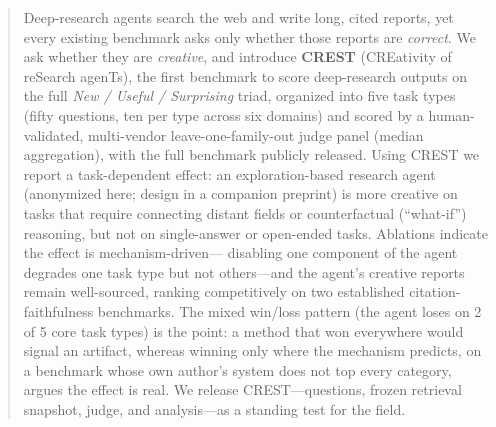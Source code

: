 \begin{abstract}
Deep-research agents search the web and write long, cited reports, yet every existing
benchmark asks only whether those reports are \emph{correct}. We ask whether they are
\emph{creative}, and introduce \textbf{CREST} (CREativity of reSearch agenTs), the first
benchmark to score deep-research outputs on the full \emph{New / Useful / Surprising} triad,
organized into five task types (fifty questions, ten per type across six domains) and scored by a
human-validated, multi-vendor leave-one-family-out judge panel (median aggregation), with the full
benchmark publicly released. Using CREST we report a task-dependent effect: an exploration-based research agent
(anonymized here; design in a companion preprint) is more creative on tasks that require
connecting distant fields or counterfactual (``what-if'') reasoning, but not on
single-answer or open-ended tasks. Ablations indicate the effect is mechanism-driven---
disabling one component of the agent degrades one task type but not others---and the
agent's creative reports remain well-sourced, ranking competitively on two established
citation-faithfulness benchmarks. The mixed win/loss pattern (the agent loses on 2 of 5
core task types) is the point: a method that won everywhere would signal an artifact,
whereas winning only where the mechanism predicts, on a benchmark whose own author's system
does not top every category, argues the effect is real. We release CREST---questions,
frozen retrieval snapshot, judge, and analysis---as a standing test for the field.
\end{abstract}
